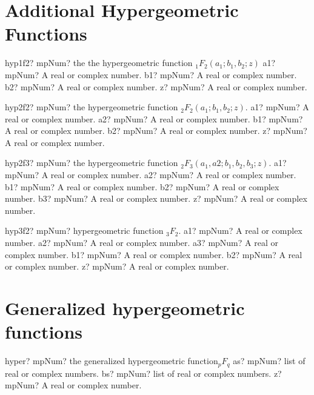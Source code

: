 \documentclass[12pt,a4paper,openany]{book}
\begin{document}
\section{Additional Hypergeometric Functions}

\begin{mpFunctionsExtract}
\mpFunctionFour
{hyp1f2? mpNum? the the hypergeometric function ${}_1F_2(a_1; b_1, b_2; z)$}
{a1? mpNum? A real or complex number.}
{b1? mpNum? A real or complex number.}
{b2? mpNum? A real or complex number.}
{z? mpNum? A real or complex number.}
\end{mpFunctionsExtract}

\begin{mpFunctionsExtract}
\mpFunctionFive
{hyp2f2? mpNum? the hypergeometric function  ${}_2F_2(a_1; b_1, b_2; z)$.}
{a1? mpNum? A real or complex number.}
{a2? mpNum? A real or complex number.}
{b1? mpNum? A real or complex number.}
{b2? mpNum? A real or complex number.}
{z? mpNum? A real or complex number.}
\end{mpFunctionsExtract}

\begin{mpFunctionsExtract}
\mpFunctionSix
{hyp2f3? mpNum? the hypergeometric function ${}_2F_3(a_1,a2;b_1,b_2,b_3;z)$.}
{a1? mpNum? A real or complex number.}
{a2? mpNum? A real or complex number.}
{b1? mpNum? A real or complex number.}
{b2? mpNum? A real or complex number.}
{b3? mpNum? A real or complex number.}
{z? mpNum? A real or complex number.}
\end{mpFunctionsExtract}

\begin{mpFunctionsExtract}
\mpFunctionSix
{hyp3f2? mpNum? hypergeometric function ${}_3F_2$.}
{a1? mpNum? A real or complex number.}
{a2? mpNum? A real or complex number.}
{a3? mpNum? A real or complex number.}
{b1? mpNum? A real or complex number.}
{b2? mpNum? A real or complex number.}
{z? mpNum? A real or complex number.}
\end{mpFunctionsExtract}

\section{Generalized hypergeometric functions}

\begin{mpFunctionsExtract}
\mpFunctionThree
{hyper? mpNum? the generalized hypergeometric function${}_pF_q$}
{as? mpNum? list of real or complex numbers.}
{bs? mpNum? list of real or complex numbers.}
{z? mpNum? A real or complex number.}
\end{mpFunctionsExtract}
\end{document}

